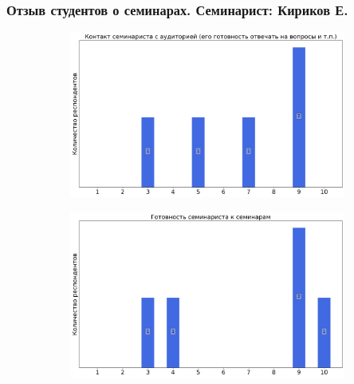     \subsubsection{Отзыв студентов о семинарах. Семинарист: Кириков Е.}
        \begin{figure}[H]
            \centering
            \begin{subfigure}[b]{0.45\textwidth}
                \centering
                \includegraphics[width=\textwidth]{images/1 course/Дискретный анализ/seminarists-marks-Кириков Е.-0.png}
            \end{subfigure}
            \begin{subfigure}[b]{0.45\textwidth}
                \centering
                \includegraphics[width=\textwidth]{images/1 course/Дискретный анализ/seminarists-marks-Кириков Е.-1.png}
            \end{subfigure}
            \begin{subfigure}[b]{0.45\textwidth}
                \centering

\end{subfigure}
\end{figure}
